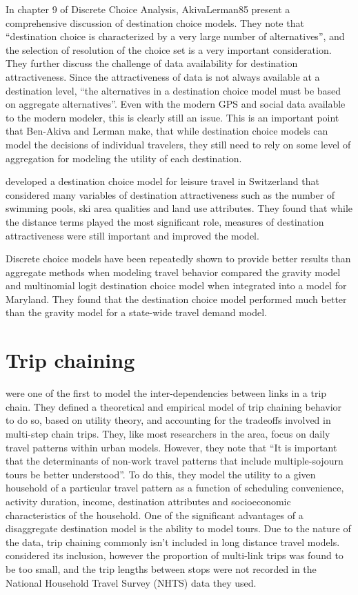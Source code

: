 In chapter 9 of Discrete Choice Analysis, {AkivaLerman85} present a comprehensive discussion of destination choice models. They note that \enquote{destination choice is characterized by a very large number of alternatives}, and the selection of resolution of the choice set is a very important consideration. They further discuss the challenge of data availability for destination attractiveness. Since the attractiveness of data is not always available at a destination level, \enquote{the alternatives in a destination choice model must be based on aggregate alternatives}. Even with the modern GPS and social data available to the modern modeler, this is clearly still an issue. This is an important point that Ben-Akiva and Lerman make, that while destination choice models can model the decisions of individual travelers, they still need to rely on some level of aggregation for modeling the utility of each destination.

\textcite{simma2001destination} developed a destination choice model for leisure travel in Switzerland that considered many variables of destination attractiveness such as the number of swimming pools, ski area qualities and land use attributes. They found that while the distance terms played the most significant role, measures of destination attractiveness were still important and improved the model. 

Discrete choice models have been repeatedly shown to provide better results than aggregate methods when modeling travel behavior \parencite*{Stephanedes84, Mishra13} compared the gravity model and multinomial logit destination choice model when integrated into a model for Maryland. They found that the destination choice model performed much better than the gravity model for a state-wide travel demand model. 

\section{Trip chaining}
\textcite{AdlerAkiva79} were one of the first to model the inter-dependencies between links in a trip chain. They defined a theoretical and empirical model of trip chaining behavior to do so, based on utility theory, and accounting for the tradeoffs involved in multi-step chain trips. They, like most researchers in the area, focus on daily travel patterns within urban models. However, they note that \enquote{It is important that the determinants of non-work travel patterns that include multiple-sojourn tours be better understood}. To do this, they model the utility to a given household of a particular travel pattern as a function of scheduling convenience, activity duration, income, destination attributes and socioeconomic characteristics of the household.
One of the significant advantages of a disaggregate destination model is the ability to model tours. Due to the nature of the data, trip chaining commonly isn't included in long distance travel models. \textcite{Moeckel15} considered its inclusion, however the proportion of multi-link trips was found to be too small, and the trip lengths between stops were not recorded in the National Household Travel Survey (NHTS) data they used. 

